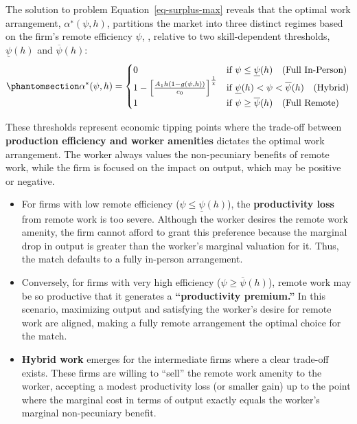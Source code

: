 \documentclass[
  11pt,
  letterpaper,
  DIV=11,
  numbers=noendperiod]{scrartcl}
\providecommand{\tightlist}{%
  \setlength{\itemsep}{0pt}\setlength{\parskip}{0pt}}\usepackage{longtable,booktabs,array}
\begin{document}
The solution to problem Equation~\ref{eq-surplus-max} reveals that the
optimal work arrangement, \(\alpha^∗(\psi,h)\), partitions the market
into three distinct regimes based on the firm's remote efficiency
\(\psi\), , relative to two skill-dependent thresholds,
\(\underline{\psi}(h)\) and \(\overline{\psi}(h)\):
\begin{equation}\phantomsection\label{eq-optimal-alpha-deterministic}{\alpha^{*}(\psi,h) = \begin{cases}
    0 & \text{if } \psi \leq \underline{\psi}(h) \quad \text{(Full In-Person)} \\ 
    1 - \left[ \frac{A_1h(1 - g(\psi,h))}{c_0} \right]^{\frac{1}{\chi}} & \text{if } \underline{\psi}(h) < \psi < \overline{\psi}(h) \quad \text{(Hybrid)} \\
    1 & \text{if } \psi \geq \overline{\psi}(h) \quad \text{(Full Remote)}
\end{cases}}\end{equation}

These thresholds represent economic tipping points where the trade-off
between \textbf{production efficiency and worker amenities} dictates the
optimal work arrangement. The worker always values the non-pecuniary
benefits of remote work, while the firm is focused on the impact on
output, which may be positive or negative.

\begin{itemize}
\tightlist
\item
  For firms with low remote efficiency
  (\(\psi\leq\underline{\psi}​(h)\)), the \textbf{productivity loss} from
  remote work is too severe. Although the worker desires the remote work
  amenity, the firm cannot afford to grant this preference because the
  marginal drop in output is greater than the worker's marginal
  valuation for it. Thus, the match defaults to a fully in-person
  arrangement.
\item
  Conversely, for firms with very high efficiency
  (\(\psi\geq\overline{\psi}(h)\)), remote work may be so productive
  that it generates a \textbf{``productivity premium.''} In this
  scenario, maximizing output and satisfying the worker's desire for
  remote work are aligned, making a fully remote arrangement the optimal
  choice for the match.
\item
  \textbf{Hybrid work} emerges for the intermediate firms where a clear
  trade-off exists. These firms are willing to ``sell'' the remote work
  amenity to the worker, accepting a modest productivity loss (or
  smaller gain) up to the point where the marginal cost in terms of
  output exactly equals the worker's marginal non-pecuniary benefit.
\end{itemize}
\end{document}
